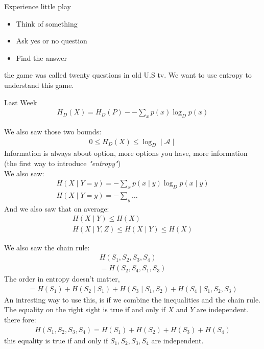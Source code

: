 \begin{parag}{Experience little play}
    \begin{itemize}
        \item Think of something
        \item Ask yes or no question
        \item Find the answer
    \end{itemize}
    the game was called twenty questions in old U.S tv. We want to use entropy to understand this game.
\end{parag}
\begin{parag}{Last Week}
\begin{align*}
    H_D(X) = H_D(P) - -\sum_x p(x) \log_D p(x)
\end{align*}

We also saw those two bounds:
\begin{align*}
    0 \leq H_D(X) \leq \log_D \mid  \mathcal{A} \mid
\end{align*}
Information is always about option, more options you have, more information (the first way to introduce \textit{"entropy"})\\
We also saw:
\begin{align*}
    H(X \mid  Y = y) = - \sum_x p(x \mid  y) \log_Dp(x \mid  y)\\
    H(X \mid  Y = y) = - \sum_y \dots
\end{align*}
And we also saw that on average:
\begin{align*}
    H(X \mid  Y) \leq H(X) \\
    H(X \mid  Y, Z) \leq H(X \mid  Y) \leq H(X)
\end{align*}

We also saw the chain rule:
    \begin{align*}
       H(S_1, S_2, S_3, S_4) \\
       = H(S_2, S_4, S_1, S_3)
    \end{align*}
    The order in entropy doesn't matter,
    \begin{align*}
        = H(S_1) + H(S_2 \mid  S_1) + H(S_3 \mid  S_1, S_2) + H(S_4 \mid  S_1, S_2, S_3)
    \end{align*}
    An intresting way to use this, is if we combine the inequalities and the chain rule. The equality on the right sight is true if and only if $X$ and $Y$ are independent. there fore:
    \begin{align*}
        H(S_1, S_2, S_3, S_4) = H(S_1) + H(S_2) + H(S_3) + H(S_4)
    \end{align*}
    this equality is true if and only if $S_1, S_2, S_3, S_4$ are independent.
    
\end{parag}


